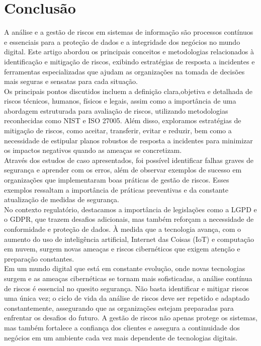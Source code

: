 \documentclass[12pt,oneside,a4paper,article]{abntex2}
\begin{document}
\section{Conclusão}

A análise e a gestão de riscos em sistemas de informação são processos contínuos e essenciais para a proteção de dados e a integridade dos negócios no mundo digital. Este artigo abordou os principais conceitos e metodologias relacionados à identificação e mitigação de riscos, exibindo estratégias de resposta a incidentes e ferramentas especializadas que ajudam as organizações na tomada de decisões mais seguras e sensatas para cada situação.
\\

Os principais pontos discutidos incluem a definição clara,objetiva e detalhada de riscos técnicos, humanos, físicos e legais, assim como a importância de uma abordagem estruturada para avaliação de riscos, utilizando metodologias reconhecidas como NIST e ISO 27005. Além disso, exploramos estratégias de mitigação de riscos, como aceitar, transferir, evitar e reduzir, bem como a necessidade de estipular planos robustos de resposta a incidentes para minimizar os impactos negativos quando as ameaças se concretizam.
\\

Através dos estudos de caso apresentados, foi possível identificar falhas graves de segurança e aprender com os erros, além de observar exemplos de sucesso em organizações que implementaram boas práticas de gestão de riscos. Esses exemplos ressaltam a importância de práticas preventivas e da constante atualização de medidas de segurança.
\\

No contexto regulatório, destacamos a importância de legislações como a LGPD e o GDPR, que trazem desafios adicionais, mas também reforçam a necessidade de conformidade e proteção de dados. À medida que a tecnologia avança, com o aumento do uso de inteligência artificial, Internet das Coisas (IoT) e computação em nuvem, surgem novas ameaças e riscos cibernéticos que exigem atenção e preparação constantes.
\\

Em um mundo digital que está em constante evolução, onde novas tecnologias surgem e as ameaças cibernéticas se tornam mais sofisticadas, a análise contínua de riscos é essencial no quesito segurança. Não basta identificar e mitigar riscos uma única vez; o ciclo de vida da análise de riscos deve ser repetido e adaptado constantemente, assegurando que as organizações estejam preparadas para enfrentar os desafios do futuro. A gestão de riscos não apenas protege os sistemas, mas também fortalece a confiança dos clientes e assegura a continuidade dos negócios em um ambiente cada vez mais dependente de tecnologias digitais.
\end{document}
